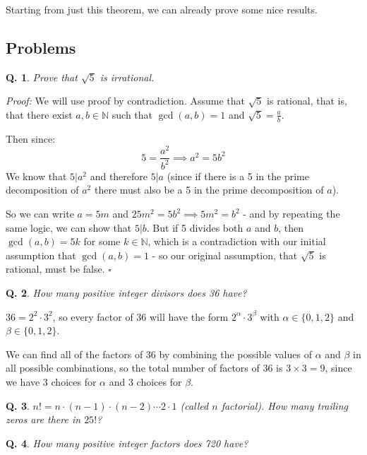 \documentclass{article}
\newtheorem{question}{Q.}
\begin{document}
Starting from just this theorem, we can already prove some nice results.

\subsection{Problems}

\begin{question}Prove that $\sqrt{5}$ is irrational.\end{question}

\emph{Proof:} We will use proof by contradiction. Assume that $\sqrt{5}$ is rational,
that is, that there exist $a,b\in \mathbb{N}$ such that $\gcd(a,b)=1$ and 
$\sqrt{5}=\frac{a}{b}$.

Then since:
\[ 5 = \frac{a^2}{b^2} \implies a^2=5b^2 \]
We know that $5 | a^2$ and therefore $5|a$ (since if there is a 5 in the prime
decomposition of $a^2$ there must also be a 5 in the prime decomposition of $a$).

So we can write $a=5m$ and $25m^2 = 5b^2 \implies 5m^2 = b^2$ - and by repeating the
same logic, we can show that $5 | b$. But if 5 divides both $a$ and $b$, then
$\gcd(a,b) = 5k$ for some $k \in \mathbb{N}$, which is a contradiction with our
initial assumption that $\gcd(a,b)=1$ - so our original assumption, that $\sqrt{5}$
is rational, must be false. 
$\square$

\begin{question}How many positive integer divisors does 36 have?\end{question}

$36 = 2^2 \cdot 3^2$, so every factor of 36 will have the form 
$2^{\alpha}\cdot 3^{\beta}$ with $\alpha \in \{0,1,2\}$ and $\beta \in \{0,1,2\}$.

We can find all of the factors of 36 by combining the possible values of $\alpha$
and $\beta$ in all possible combinations, so the total number of factors of 36 is 
$3 \times 3 = 9$, since we have 3 choices for $\alpha$ and 3 choices for $\beta$.


\begin{question} $n! = n\cdot (n-1)\cdot (n-2) \cdots 2 \cdot 1$ (called $n$
factorial). How many trailing zeros are there in $25!$?\end{question}
\vspace*{\bigskipamount}

\begin{question}How many positive integer factors does 720 have?\end{question}
\vspace*{\bigskipamount}
\end{document}
